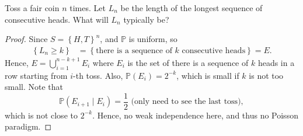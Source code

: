 \begin{eg}
    Toss a fair coin \(n\) times. Let \(L_n\) be the length of the longest sequence of consecutive heads. What will \(L_n\) typically be?   
\end{eg}

\begin{proof}
    Since \(S = \left\{ H, T \right\}^n \), and \(\mathbb{P} \) is uniform, so 
    \begin{align*}
        \left\{ L_n \ge k \right\} &= \left\{ \text{there is a sequence of } k \text{ consecutive heads}   \right\} = E.  
    \end{align*}  
    Hence, \(E = \bigcup_{i=1}^{n - k + 1} E_i\) where \(E_i\) is the set of there is a sequence of \(k\) heads in a row starting from \(i\)-th toss. Also, \(\mathbb{P} (E_i) = 2^{-k}\), which is small if \(k\) is not too small. Note that 
    \[
        \mathbb{P} (E_{i+1} \mid E_i) = \frac{1}{2} \text{ (only need to see the last toss)}, 
    \]     
    which is not close to \(2^{-k}\). Hence, no weak independence here, and thus no Poisson paradigm.


\end{proof}
